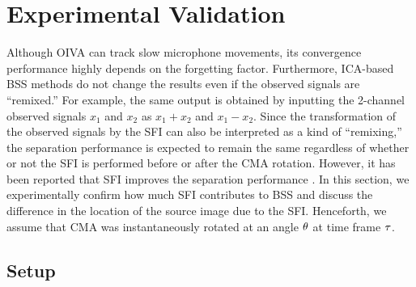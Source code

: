 \documentclass[sip,biber]{now-journal}
\begin{document}
\section{Experimental Validation}\label{sec:experiment}
Although OIVA can track slow microphone movements, its convergence performance highly depends on the forgetting factor.
Furthermore, ICA-based BSS methods do not change the results even if the observed signals are ``remixed.''
For example, the same output is obtained by inputting the 2-channel observed signals $x_1$ and $x_2$ as $x_1 + x_2$ and $x_1 - x_2$.
Since the transformation of the observed signals by the SFI can also be interpreted as a kind of ``remixing,''
the separation performance is expected to remain the same regardless of whether or not the SFI is performed before or after the CMA rotation.
However, it has been reported that SFI improves the separation performance \cite{Nakashima:2022:ASJ:A}.
In this section, we experimentally confirm how much SFI contributes to BSS and discuss the difference in the location of the source image due to the SFI.
Henceforth, we assume that CMA was instantaneously rotated at an angle $\theta$ at time frame $\tau$.

\subsection{Setup}
\end{document}
